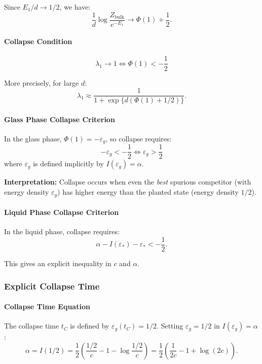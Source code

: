 \documentclass[11pt]{article}
\begin{document}
Since $E_1/d \to 1/2$, we have:
\begin{equation}
\frac{1}{d}\log\frac{Z_{\text{bulk}}}{e^{-E_1}} \to \Phi(1) + \frac{1}{2}.
\end{equation}

\paragraph{Collapse Condition}
\begin{equation}
\boxed{\lambda_1 \to 1 \iff \Phi(1) < -\frac{1}{2}}
\end{equation}

More precisely, for large $d$:
\begin{equation}
\lambda_1 \approx \frac{1}{1 + \exp\{d(\Phi(1) + 1/2)\}}.
\end{equation}

\paragraph{Glass Phase Collapse Criterion}
In the glass phase, $\Phi(1) = -\varepsilon_g$, so collapse requires:
\begin{equation}
\boxed{-\varepsilon_g < -\frac{1}{2} \iff \varepsilon_g > \frac{1}{2}}
\end{equation}
where $\varepsilon_g$ is defined implicitly by $I(\varepsilon_g) = \alpha$.

\textbf{Interpretation:} Collapse occurs when even the \emph{best} spurious competitor (with energy density $\varepsilon_g$) has higher energy than the planted state (energy density $1/2$).

\paragraph{Liquid Phase Collapse Criterion}
In the liquid phase, collapse requires:
\begin{equation}
\alpha - I(\varepsilon_*) - \varepsilon_* < -\frac{1}{2}.
\end{equation}

This gives an explicit inequality in $c$ and $\alpha$.

\subsubsection{Explicit Collapse Time}
\paragraph{Collapse Time Equation}
The collapse time $t_C$ is defined by $\varepsilon_g(t_C) = 1/2$. Setting $\varepsilon_g = 1/2$ in $I(\varepsilon_g) = \alpha$:
\begin{equation}
\alpha = I(1/2) = \frac{1}{2}\left(\frac{1/2}{c} - 1 - \log\frac{1/2}{c}\right) = \frac{1}{2}\left(\frac{1}{2c} - 1 + \log(2c)\right).
\end{equation}
\end{document}
